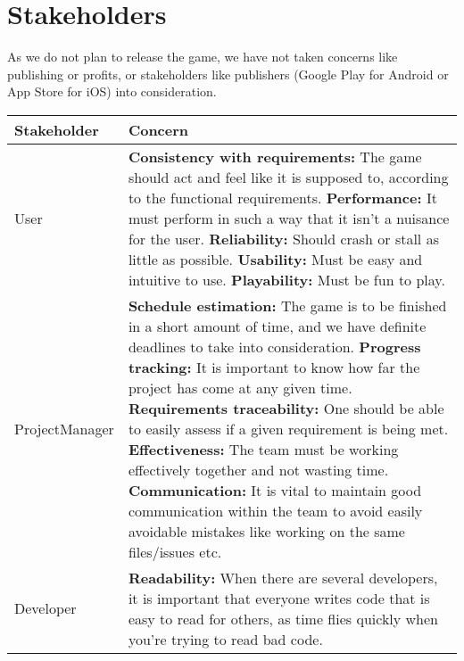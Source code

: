 \section{Stakeholders}

As we do not plan to release the game, we have not taken concerns like publishing or profits, or stakeholders like publishers (Google Play for Android or App Store for iOS) into consideration.

\begin{center}
\begin{longtable}{|p{3cm} | p{10cm}|}
    \hline
        \label{tab:stakeholders}
        \textbf{Stakeholder} & \textbf{Concern} \\ \hline \hline
        User & 
        \textbf{Consistency with requirements:} The game should act and feel like it is supposed to, according to the functional requirements. 
        \newline \textbf{Performance:} It must perform in such a way that it isn't a nuisance for the user. 
        \newline \textbf{Reliability:} Should crash or stall as little as possible. 
        \newline \textbf{Usability:} Must be easy and intuitive to use.
        \newline \textbf{Playability:} Must be fun to play.\\ \hline
        Project\newline Manager &
        \textbf{Schedule estimation:} The game is to be finished in a short amount of time, and we have definite deadlines to take into consideration.
        \newline \textbf{Progress tracking:} It is important to know how far the project has come at any given time.
        \newline \textbf{Requirements traceability:} One should be able to easily assess if a given requirement is being met. 
        \newline \textbf{Effectiveness:} The team must be working effectively together and not wasting time.
        \newline \textbf{Communication:} It is vital to maintain good communication within the team to avoid easily avoidable mistakes like working on the same files/issues etc. \\ \hline
        Developer & 
        \textbf{Readability:} When there are several developers, it is important that everyone writes code that is easy to read for others, as time flies quickly when you're trying to read bad code.

\end{longtable}
\end{center}
